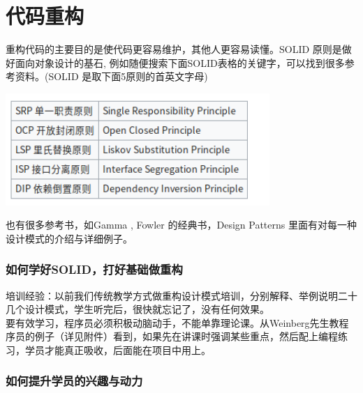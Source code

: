 \chapter{代码重构} %

重构代码的主要目的是使代码更容易维护，其他人更容易读懂。SOLID
原则是做好面向对象设计的基石,
例如随便搜索下面SOLID表格的关键字，可以找到很多参考资料。(SOLID
是取下面5原则的首英文字母)


\includegraphics[width=10cm]{Screenshotfrom2022-12-2822-14-39.png}

也有很多参考书，如Gamma , Fowler 的经典书，Design Patterns
里面有对每一种设计模式的介绍与详细例子。

\hypertarget{ux5982ux4f55ux5b66ux597dsolidux6253ux597dux57faux7840ux505aux91cdux6784}{%
\subsection{如何学好SOLID，打好基础做重构}\label{ux5982ux4f55ux5b66ux597dsolidux6253ux597dux57faux7840ux505aux91cdux6784}}

培训经验：以前我们传统教学方式做重构设计模式培训，分别解释、举例说明二十几个设计模式，学生听完后，很快就忘记了，没有任何效果。\\
要有效学习，程序员必须积极动脑动手，不能单靠理论课。从Weinberg先生教程序员的例子（详见附件）看到，如果先在讲课时强调某些重点，然后配上编程练习，学员才能真正吸收，后面能在项目中用上。

\hypertarget{ux5982ux4f55ux63d0ux5347ux5b66ux5458ux7684ux5174ux8da3ux4e0eux52a8ux529b}{%
\subsection{如何提升学员的兴趣与动力}\label{ux5982ux4f55ux63d0ux5347ux5b66ux5458ux7684ux5174ux8da3ux4e0eux52a8ux529b}}

